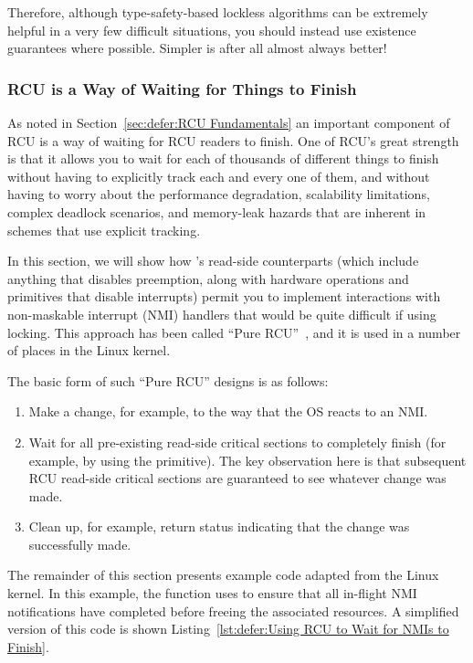 Therefore, although type-safety-based lockless algorithms can be extremely
helpful in a very few difficult situations, you should instead use existence
guarantees where possible.
Simpler is after all almost always better!

\fi

\subsubsection{RCU is a Way of Waiting for Things to Finish}
\label{sec:defer:RCU is a Way of Waiting for Things to Finish}

As noted in Section~\ref{sec:defer:RCU Fundamentals}
an important component
of RCU is a way of waiting for RCU readers to finish.
One of
RCU's great strength is that it allows you to wait for each of
thousands of different things to finish without having to explicitly
track each and every one of them, and without having to worry about
the performance degradation, scalability limitations, complex deadlock
scenarios, and memory-leak hazards that are inherent in schemes that
use explicit tracking.

In this section, we will show how 's
read-side counterparts (which include anything that disables preemption,
along with hardware operations and
primitives that disable interrupts) permit you to implement interactions with
non-maskable interrupt
(NMI) handlers that would be quite difficult if using locking.
This approach has been called ``Pure RCU''~\cite{PaulEdwardMcKenneyPhD},
and it is used in a number of places in the Linux kernel.

The basic form of such ``Pure RCU'' designs is as follows:

\begin{enumerate}
\item	Make a change, for example, to the way that the OS reacts to an NMI\@.
\item	Wait for all pre-existing read-side critical sections to
	completely finish (for example, by using the
	 primitive).
	The key observation here is that subsequent RCU read-side critical
	sections are guaranteed to see whatever change was made.
\item	Clean up, for example, return status indicating that the
	change was successfully made.
\end{enumerate}

The remainder of this section presents example code adapted from
the Linux kernel.
In this example, the  function uses
 to ensure that all in-flight NMI
notifications have completed before freeing the associated resources.
A simplified version of this code is shown
Listing~\ref{lst:defer:Using RCU to Wait for NMIs to Finish}.

